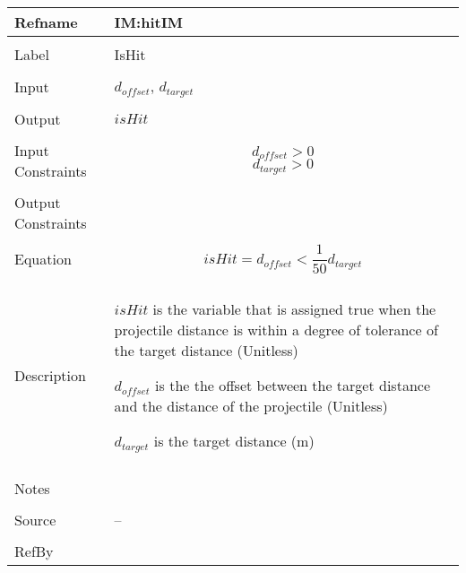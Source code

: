 \documentclass[12pt]{article}
\begin{document}
\noindent \begin{minipage}{\textwidth}
\begin{tabular}{p{} p{}}
\toprule \textbf{Refname} & \textbf{IM:hitIM}
\label{IM:hitIM}
\\ \midrule \\
Label & IsHit
\\ \midrule \\
Input & ${d_{offset}}$, ${d_{target}}$
\\ \midrule \\
Output & $isHit$
\\ \midrule \\
Input Constraints & \begin{displaymath}
                    {d_{offset}}>0
                    \end{displaymath}
                    \begin{displaymath}
                    {d_{target}}>0
                    \end{displaymath}
\\ \midrule \\
Output Constraints & 
\\ \midrule \\
Equation & \begin{displaymath}
           isHit={d_{offset}}<\frac{1}{50} {d_{target}}
           \end{displaymath}
\\ \midrule \\
Description & \begin{symbDescription}
              \item{$isHit$ is the variable that is assigned true when the projectile distance is within a degree of tolerance of the target distance (Unitless)}
              \item{${d_{offset}}$ is the the offset between the target distance and the distance of the projectile (Unitless)}
              \item{${d_{target}}$ is the target distance (m)}
              \end{symbDescription}
\\ \midrule \\
Notes & 
\\ \midrule \\
Source & --
\\ \midrule \\
RefBy & 
\\ \bottomrule \end{tabular}
\end{minipage}
\end{document}
